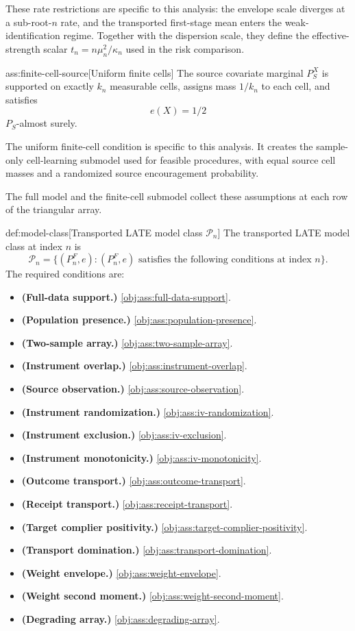 These rate restrictions are specific to this analysis: the envelope scale diverges at a sub-root-\(n\) rate, and the transported first-stage mean  enters the weak-identification regime.  Together with the dispersion scale, they define the effective-strength scalar \(t_n=n\mu_n^2/\kappa_n\) used in the risk comparison.

\begin{assumptionv}{ass:finite-cell-source}[Uniform finite cells]
The source covariate marginal \(P_S^X\) is supported on exactly \(k_n\) measurable cells, assigns mass \(1/k_n\) to each cell, and satisfies
\[
e(X)=1/2
\]
\(P_S\)-almost surely.
\end{assumptionv}

The uniform finite-cell condition is specific to this analysis.  It creates the sample-only cell-learning submodel used for feasible procedures, with equal source cell masses and a randomized source encouragement probability.

The full model and the finite-cell submodel collect these assumptions at each row of the triangular array.

\begin{definitionv}{def:model-class}[Transported LATE model class \(\mathcal P_n\)]
The transported LATE model class at index \(n\) is
\[
\mathcal P_n
=
\bigl\{(P_n^F,e): (P_n^F,e)\text{ satisfies the following conditions at index }n\bigr\}.
\]
The required conditions are:
\begin{itemize}
\item \textbf{(Full-data support.)} \cref{obj:ass:full-data-support}.
\item \textbf{(Population presence.)} \cref{obj:ass:population-presence}.
\item \textbf{(Two-sample array.)} \cref{obj:ass:two-sample-array}.
\item \textbf{(Instrument overlap.)} \cref{obj:ass:instrument-overlap}.
\item \textbf{(Source observation.)} \cref{obj:ass:source-observation}.
\item \textbf{(Instrument randomization.)} \cref{obj:ass:iv-randomization}.
\item \textbf{(Instrument exclusion.)} \cref{obj:ass:iv-exclusion}.
\item \textbf{(Instrument monotonicity.)} \cref{obj:ass:iv-monotonicity}.
\item \textbf{(Outcome transport.)} \cref{obj:ass:outcome-transport}.
\item \textbf{(Receipt transport.)} \cref{obj:ass:receipt-transport}.
\item \textbf{(Target complier positivity.)} \cref{obj:ass:target-complier-positivity}.
\item \textbf{(Transport domination.)} \cref{obj:ass:transport-domination}.
\item \textbf{(Weight envelope.)} \cref{obj:ass:weight-envelope}.
\item \textbf{(Weight second moment.)} \cref{obj:ass:weight-second-moment}.
\item \textbf{(Degrading array.)} \cref{obj:ass:degrading-array}.
\end{itemize}
\end{definitionv}

